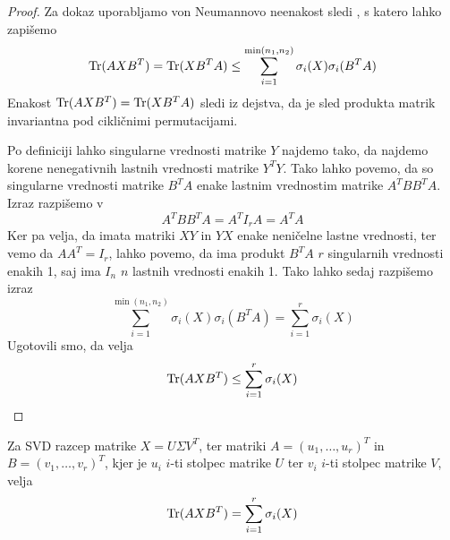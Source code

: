 \begin{proof}
    Za dokaz uporabljamo von Neumannovo neenakost sledi \cite{TNNM-HZYLH12}, s katero lahko zapišemo
    \[
        \operatorname{Tr}(AXB^T) = \operatorname{Tr}(XB^TA) \leq \sum^{\min(n_1, n_2)}_{i=1} \sigma_i(X) \sigma_i(B^TA)
    \]
    Enakost $\operatorname{Tr}(AXB^T) = \operatorname{Tr}(XB^TA)$ sledi iz dejstva, da je sled produkta matrik invariantna pod cikličnimi permutacijami.

    Po definiciji lahko singularne vrednosti matrike $Y$ najdemo tako, da najdemo korene nenegativnih lastnih vrednosti matrike $Y^TY$. Tako lahko povemo, da so singularne vrednosti matrike $B^TA$ enake lastnim vrednostim matrike $A^TBB^TA$. Izraz razpišemo v
    \[
        A^TBB^TA = A^TI_rA = A^TA
    \]
    Ker pa velja, da imata matriki $XY$ in $YX$ enake neničelne lastne vrednosti, ter vemo da $AA^T = I_r$, lahko povemo, da ima produkt $B^TA$ $r$ singularnih vrednosti enakih 1, saj ima $I_n$ $n$ lastnih vrednosti enakih 1.
    Tako lahko sedaj razpišemo izraz
    \[
        \sum^{\min(n_1, n_2)}_{i=1} \sigma_i(X) \sigma_i(B^TA) = \sum^{r}_{i=1} \sigma_i(X)
    \]
    Ugotovili smo, da velja
    \begin{equation}
        \label{2806-1320}
        \operatorname{Tr}(AXB^T) \leq \sum^{r}_{i=1} \sigma_i(X)
    \end{equation}
\end{proof}

\begin{theorem}
    Za SVD razcep matrike $X = U \Sigma V^T$, ter matriki
    $A = (u_1, \hdots , u_r)^T$ in $B = (v_1, \hdots , v_r)^T$,
    kjer je $u_i$ $i$-ti stolpec matrike $U$ ter $v_i$ $i$-ti stolpec
    matrike $V$, velja \[\operatorname{Tr}(AXB^T) = \sum^{r}_{i=1} \sigma_i(X)\]
\end{theorem}

